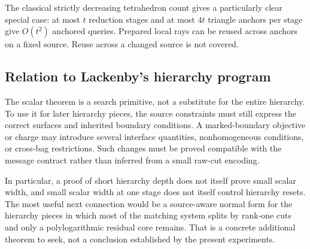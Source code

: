 The classical strictly decreasing tetrahedron count gives a particularly clear
special case: at most $t$ reduction stages and at most $4t$ triangle anchors
per stage give $O(t^2)$ anchored queries. Prepared local rays can be reused
across anchors on a fixed source. Reuse across a changed source is not covered.

\subsection{Relation to Lackenby's hierarchy program}

The scalar theorem is a search primitive, not a substitute for the entire
hierarchy. To use it for later hierarchy pieces, the source constraints must
still express the correct surfaces and inherited boundary conditions. A
marked-boundary objective or charge may introduce several interface quantities,
nonhomogeneous conditions, or cross-bag restrictions. Such changes must be
proved compatible with the message contract rather than inferred from a small
raw-cut encoding.

In particular, a proof of short hierarchy depth does not itself prove small
scalar width, and small scalar width at one stage does not itself control
hierarchy resets. The most useful next connection would be a source-aware
normal form for the hierarchy pieces in which most of the matching system
splits by rank-one cuts and only a polylogarithmic residual core remains.
That is a concrete additional theorem to seek, not a conclusion established
by the present experiments.

